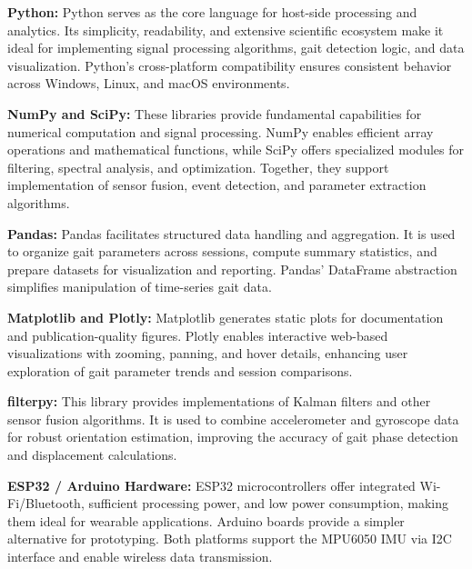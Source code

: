 \documentclass[12pt,a4paper]{report}
\begin{document}
\vspace{0.4cm}

\textbf{Python:}  
Python serves as the core language for host-side processing and analytics. Its simplicity, readability, and extensive scientific ecosystem make it ideal for implementing signal processing algorithms, gait detection logic, and data visualization. Python's cross-platform compatibility ensures consistent behavior across Windows, Linux, and macOS environments.

\vspace{0.4cm}

\textbf{NumPy and SciPy:}  
These libraries provide fundamental capabilities for numerical computation and signal processing. NumPy enables efficient array operations and mathematical functions, while SciPy offers specialized modules for filtering, spectral analysis, and optimization. Together, they support implementation of sensor fusion, event detection, and parameter extraction algorithms.

\vspace{0.4cm}

\textbf{Pandas:}  
Pandas facilitates structured data handling and aggregation. It is used to organize gait parameters across sessions, compute summary statistics, and prepare datasets for visualization and reporting. Pandas' DataFrame abstraction simplifies manipulation of time-series gait data.

\vspace{0.4cm}

\textbf{Matplotlib and Plotly:}  
Matplotlib generates static plots for documentation and publication-quality figures. Plotly enables interactive web-based visualizations with zooming, panning, and hover details, enhancing user exploration of gait parameter trends and session comparisons.

\vspace{0.4cm}

\textbf{filterpy:}  
This library provides implementations of Kalman filters and other sensor fusion algorithms. It is used to combine accelerometer and gyroscope data for robust orientation estimation, improving the accuracy of gait phase detection and displacement calculations.

\vspace{0.4cm}

\textbf{ESP32 / Arduino Hardware:}  
ESP32 microcontrollers offer integrated Wi-Fi/Bluetooth, sufficient processing power, and low power consumption, making them ideal for wearable applications. Arduino boards provide a simpler alternative for prototyping. Both platforms support the MPU6050 IMU via I2C interface and enable wireless data transmission.
\end{document}
